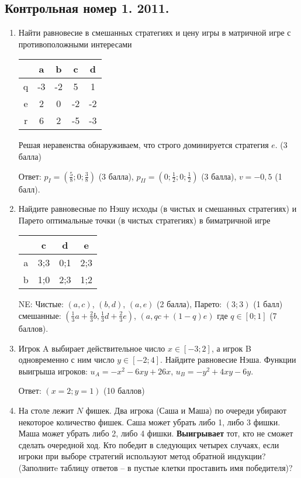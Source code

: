 \documentclass[pdftex,12pt,a4paper]{article}
\begin{document}
\subsection{Контрольная номер 1. 2011.} 
\begin{enumerate}

\item Найти равновесие в смешанных стратегиях и цену игры в матричной игре с противоположными интересами

\begin{tabular}{c|cccc}
 & a & b & c & d \\ 
\hline 
q & -3 & -2 & 5 & 1 \\ 
e & 2 & 0 & -2 & -2 \\ 
r & 6 & 2 & -5 & -3 \\ 
\end{tabular} 



Решая неравенства обнаруживаем, что строго доминируется стратегия $e$. (3 балла)

Ответ: $p_{I}=(\frac{5}{8};0;\frac{3}{8})$ (3 балла), $p_{II}=(0;\frac{1}{2};0;\frac{1}{2})$ (3 балла), $v=-0{,}5$ (1 балл).

\item Найдите равновесные по Нэшу исходы (в чистых и смешанных стратегиях) и Парето оптимальные точки (в чистых стратегиях) в биматричной игре

\begin{tabular}{c|ccc}
 & c & d & e \\ 
\hline 
a & 3;3 & 0;1 & 2;3 \\ 
b & 1;0 & 2;3 & 1;2 \\ 
\end{tabular} 


NE: Чистые: $(a,c)$, $(b,d)$, $(a,e)$ (2 балла), Парето: $(3;3)$ (1 балл) \\
смешанные: $(\frac{1}{3}a+\frac{2}{3}b,\frac{1}{3}d+\frac{2}{3}e)$, $(a,qc+(1-q)e)$ где $q\in [0;1]$ (7 баллов). 

\item Игрок A выбирает действительное число $x\in [-3;2]$, а игрок B одновременно с ним число $y\in [-2;4]$. Найдите равновесие Нэша. Функции выигрыша игроков: $u_A=-x^2-6xy+26x$, $u_B=-y^2+4xy-6y$.

Ответ: $(x=2;y=1)$ (10 баллов)

\item На столе лежит $N$ фишек. Два игрока (Саша и Маша) по очереди убирают некоторое количество фишек. Саша может убрать либо 1, либо 3 фишки. Маша может убрать либо 2, либо 4 фишки. \textbf{Выигрывает} тот, кто не сможет сделать очередной ход. Кто победит в следующих четырех случаях, если игроки при выборе стратегий используют метод обратной индукции? (Заполнитe таблицу ответов – в пустые клетки проставить имя победителя)?


\end{enumerate}
\end{document}

